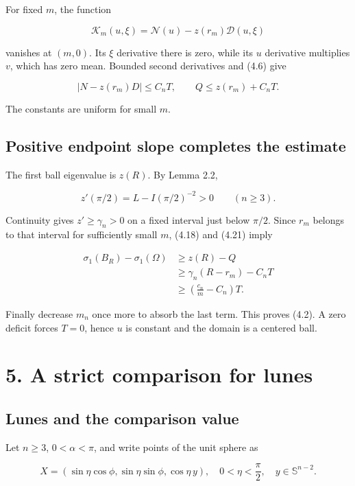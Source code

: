 \documentclass[11pt]{article}
\begin{document}
For fixed \(m\), the function

\[
\mathcal K_m(u,\xi)=\mathcal N(u)-z(r_m)\mathcal D(u,\xi)
\tag{4.20}
\]

vanishes at \((m,0)\). Its \(\xi\) derivative there is zero, while its
\(u\) derivative multiplies \(v\), which has zero mean. Bounded second
derivatives and (4.6) give

\[
|N-z(r_m)D|\leq C_nT,\qquad
Q\leq z(r_m)+C_nT.
\tag{4.21}
\]

The constants are uniform for small \(m\).

\subsection{Positive endpoint slope completes the
estimate}\label{positive-endpoint-slope-completes-the-estimate}

The first ball eigenvalue is \(z(R)\). By Lemma 2.2,

\[
z'(\pi/2)=L-I(\pi/2)^{-2}>0\qquad(n\geq3).
\tag{4.22}
\]

Continuity gives \(z'\geq\gamma_n>0\) on a fixed interval just below
\(\pi/2\). Since \(r_m\) belongs to that interval for sufficiently small
\(m\), (4.18) and (4.21) imply

\[
\begin{aligned}
\sigma_1(B_R)-\sigma_1(\Omega)
&\geq z(R)-Q\\
&\geq \gamma_n(R-r_m)-C_nT\\
&\geq \left(\frac{c_n}{m}-C_n\right)T.
\end{aligned}
\tag{4.23}
\]

Finally decrease \(m_n\) once more to absorb the last term. This proves
(4.2). A zero deficit forces \(T=0\), hence \(u\) is constant and the
domain is a centered ball.

\section{5. A strict comparison for
lunes}\label{a-strict-comparison-for-lunes}

\subsection{Lunes and the comparison
value}\label{lunes-and-the-comparison-value}

Let \(n\geq3\), \(0<\alpha<\pi\), and write points of the unit sphere as

\[
X=(\sin\eta\cos\phi,\sin\eta\sin\phi,\cos\eta\,y),
\quad 0<\eta<\frac{\pi}{2},\quad y\in\mathbb S^{n-2}.
\tag{5.1}
\]
\end{document}
